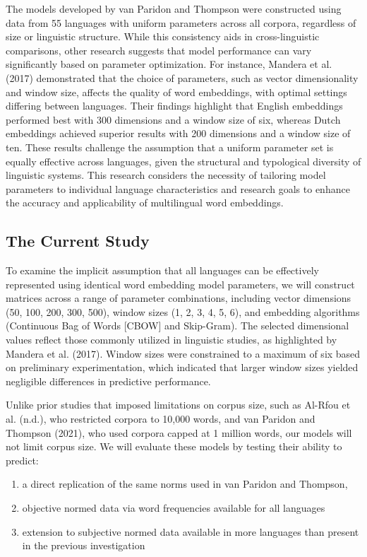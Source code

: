 \documentclass[
  english,
  man,floatsintext]{apa6}
\providecommand{\tightlist}{%
  \setlength{\itemsep}{0pt}\setlength{\parskip}{0pt}}
\begin{document}
The models developed by van Paridon and Thompson were constructed using data from 55 languages with uniform parameters across all corpora, regardless of size or linguistic structure. While this consistency aids in cross-linguistic comparisons, other research suggests that model performance can vary significantly based on parameter optimization. For instance, Mandera et al. (2017) demonstrated that the choice of parameters, such as vector dimensionality and window size, affects the quality of word embeddings, with optimal settings differing between languages. Their findings highlight that English embeddings performed best with 300 dimensions and a window size of six, whereas Dutch embeddings achieved superior results with 200 dimensions and a window size of ten. These results challenge the assumption that a uniform parameter set is equally effective across languages, given the structural and typological diversity of linguistic systems. This research considers the necessity of tailoring model parameters to individual language characteristics and research goals to enhance the accuracy and applicability of multilingual word embeddings.

\subsection{The Current Study}\label{the-current-study}

To examine the implicit assumption that all languages can be effectively represented using identical word embedding model parameters, we will construct matrices across a range of parameter combinations, including vector dimensions (50, 100, 200, 300, 500), window sizes (1, 2, 3, 4, 5, 6), and embedding algorithms (Continuous Bag of Words {[}CBOW{]} and Skip-Gram). The selected dimensional values reflect those commonly utilized in linguistic studies, as highlighted by Mandera et al. (2017). Window sizes were constrained to a maximum of six based on preliminary experimentation, which indicated that larger window sizes yielded negligible differences in predictive performance.

Unlike prior studies that imposed limitations on corpus size, such as Al-Rfou et al. (n.d.), who restricted corpora to 10,000 words, and van Paridon and Thompson (2021), who used corpora capped at 1 million words, our models will not limit corpus size. We will evaluate these models by testing their ability to predict:

\begin{enumerate}
\def\labelenumi{\arabic{enumi})}
\tightlist
\item
  a direct replication of the same norms used in van Paridon and Thompson,
\item
  objective normed data via word frequencies available for all languages
\item
  extension to subjective normed data available in more languages than present in the previous investigation
\end{enumerate}
\end{document}

